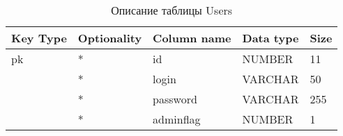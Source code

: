 \begin{xltabular}{\textwidth}{|X|X|p{4.0cm}|X|X|}
	\caption{Описание таблицы Users\label{tab:users}}\\
	\hline
	Key Type & Optionality & Column name & Data type & Size \\ \hline
	pk & * & id & NUMBER & 11 \\ \hline
	& * & login & VARCHAR & 50 \\ \hline
	& * & password & VARCHAR & 255 \\ \hline
	& * & adminflag & NUMBER & 1 \\ \hline
\end{xltabular}

\renewcommand{\arraystretch}{1.0}


